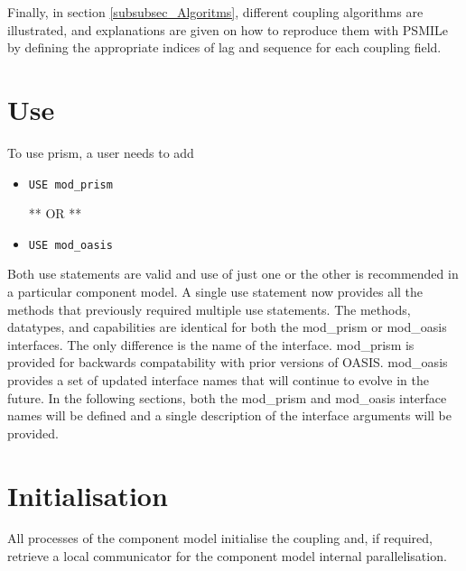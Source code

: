 Finally, in section \ref{subsubsec_Algoritms}, different coupling
algorithms are illustrated, and explanations are given on how to
reproduce them with PSMILe by defining the appropriate indices of
lag and sequence for each coupling field.

\section{Use}
\label{subsubsec_Use}

To use prism, a user needs to add 

\begin{itemize}

\item {\tt USE mod\_prism}

 ** OR **

\item {\tt USE mod\_oasis}
 
\end{itemize}

Both use statements are valid and use of just one or the other
is recommended in a particular component model.  
A single use statement now provides all the methods
that previously required multiple use statements.  The 
methods, datatypes, and capabilities are identical for both the
mod\_prism or mod\_oasis interfaces.  The only difference is the name
of the interface.  mod\_prism is provided
for backwards compatability with prior versions of OASIS.  mod\_oasis
provides a set of updated interface names that will continue to evolve
in the future.  In the following sections, both the mod\_prism
and mod\_oasis interface names will be defined and a single description
of the interface arguments will be provided.

\section{Initialisation}
\label{subsubsec_Initialisation}

All processes of the component model initialise the coupling and, if
required, retrieve a local communicator for the component model
internal parallelisation.

